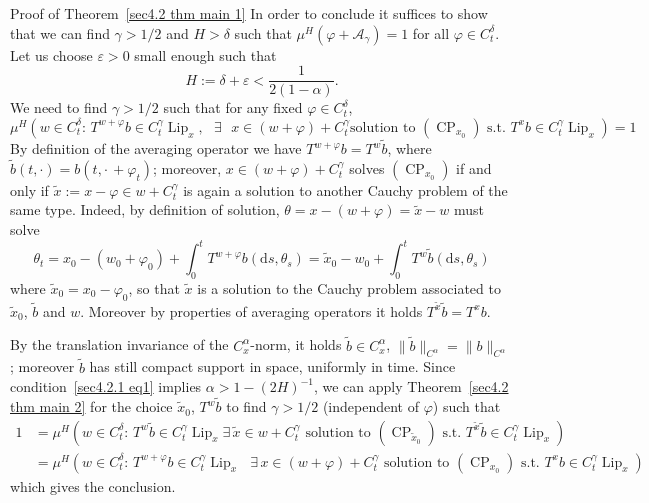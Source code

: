 \documentclass[10pt]{article}
\newcommand{\assign}{:=}
\newcommand{\mathd}{\mathrm{d}}
\newcommand{\tmop}[1]{\ensuremath{\operatorname{#1}}}
\newenvironment{proof*}[1]{\noindent\textbf{#1\ }}{\hspace*{\fill}$\Box$\medskip}
\begin{document}
\begin{proof*}{Proof of Theorem~\ref{sec4.2 thm main 1}}
  In order to conclude it suffices to show that we can find $\gamma > 1 / 2$
  and $H > \delta$ such that $\mu^H (\varphi + \mathcal{A}_{\gamma}) = 1$ for
  all $\varphi \in C_t^{\delta}$. Let us choose $\varepsilon > 0$ small enough
  such that
  \begin{equation}
    H \assign \delta + \varepsilon < \frac{1}{2 (1 - \alpha)} \label{sec4.2.1
    eq1} .
  \end{equation}
  We need to find $\gamma > 1 / 2$ such that for any fixed $\varphi \in
  C_t^{\delta}$,
  \[ \mu^H \left( w \in C_t^{\delta} : \, T^{w + \varphi} b \in C^{\gamma}_t
     \tmop{Lip}_x, \text{ $\exists$ $x \in (w + \varphi) + C_t^{\gamma}$
     solution to $(\tmop{CP}_{x_0})$ s.t. } T^x b \in C^{\gamma}_t
     \tmop{Lip}_x \right) = 1 \]
  By definition of the averaging operator we have $T^{w + \varphi} b = T^w
  \tilde{b}$, where $\tilde{b} (t, \cdot) = b \left( t, \cdot \, + \varphi_t
  \right)$; moreover, $x \in (w + \varphi) + C_t^{\gamma}$ solves
  $(\tmop{CP}_{x_0})$ if and only if $\tilde{x} \assign x - \varphi \in w +
  C_t^{\gamma}$ is again a solution to another Cauchy problem of the same
  type. Indeed, by definition of solution, $\theta = x - (w + \varphi) =
  \tilde{x} - w$ must solve
  \[ \theta_t = x_0 - (w_0 + \varphi_0) + \int_0^t T^{w + \varphi} b (\mathd
     s, \theta_s) = \tilde{x}_0 - w_0 + \int_0^t T^w \tilde{b} (\mathd s,
     \theta_s) \]
  where $\tilde{x}_0 = x_0 - \varphi_0$, so that $\tilde{x}$ is a solution to
  the Cauchy problem associated to $\tilde{x}_0$, $\tilde{b}$ and $w$.
  Moreover by properties of averaging operators it holds $T^{\tilde{x}}
  \tilde{b} = T^x b$.
  
  By the translation invariance of the $C^{\alpha}_x$-norm, it holds
  $\tilde{b} \in C^{\alpha}_x$, $\| \tilde{b} \|_{C^{\alpha}} = \| b
  \|_{C^{\alpha}}$; moreover $\tilde{b}$ has still compact support in space,
  uniformly in time. Since condition~{\eqref{sec4.2.1 eq1}} implies $\alpha >
  1 - (2 H)^{- 1}$, we can apply Theorem~\ref{sec4.2 thm main 2} for the
  choice $\tilde{x}_0$, $T^w \tilde{b}$ to find $\gamma > 1 / 2$ (independent
  of $\varphi$) such that
  \begin{align*}
    1 & = \mu^H \left( w \in C_t^{\delta} : \, T^w \tilde{b} \in
    C^{\gamma}_t \tmop{Lip}_x \text{$\exists\, \tilde{x} \in w +
    C_t^{\gamma}$ solution to $(\tmop{CP}_{\tilde{x}_0})$ s.t. } T^{\tilde{x}}
    \tilde{b} \in C^{\gamma}_t \tmop{Lip}_x \right)\\
    & = \mu^H \left( w \in C_t^{\delta} : \, T^{w + \varphi} b \in
    C^{\gamma}_t \tmop{Lip}_x \text{ $\exists\, x \in (w + \varphi) +
    C_t^{\gamma}$ solution to $(\tmop{CP}_{x_0})$ s.t. } T^x b \in
    C^{\gamma}_t \tmop{Lip}_x \right)
  \end{align*}
  which gives the conclusion.
\end{proof*}
\end{document}
